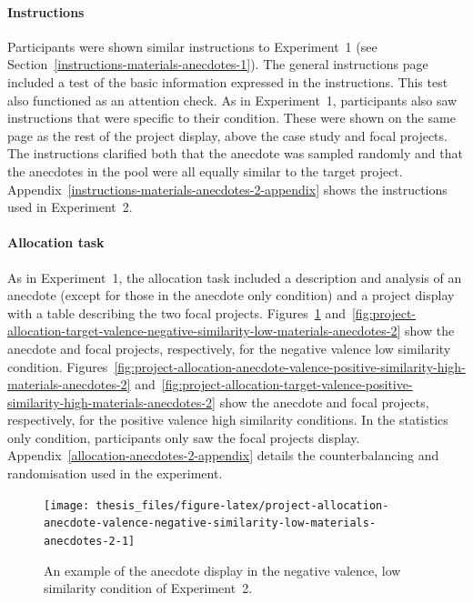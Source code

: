 \documentclass[a4paper, nobind, dvipsnames]{templates/ociamthesis}
\theoremstyle{definition}
\theoremstyle{definition}
\theoremstyle{definition}
\theoremstyle{definition}
\theoremstyle{remark}
\begin{document}
\paragraph{Instructions}

Participants were shown similar instructions to Experiment~1 (see
Section~\ref{instructions-materials-anecdotes-1}). The general instructions
page included a test of the basic information expressed in the instructions.
This test also functioned as an attention check. As in Experiment~1,
participants also saw instructions that were specific to their condition. These
were shown on the same page as the rest of the project display, above the case
study and focal projects. The instructions clarified both that the anecdote was
sampled randomly and that the anecdotes in the pool were all equally similar to
the target project. Appendix~\ref{instructions-materials-anecdotes-2-appendix}
shows the instructions used in Experiment~2.

\hypertarget{allocation-anecdotes-2}{%
\paragraph{Allocation task}\label{allocation-anecdotes-2}}

As in Experiment~1, the allocation task included a description and analysis of
an anecdote (except for those in the anecdote only condition) and a project
display with a table describing the two focal projects.
Figures~\ref{fig:project-allocation-anecdote-valence-negative-similarity-low-materials-anecdotes-2}
and~\ref{fig:project-allocation-target-valence-negative-similarity-low-materials-anecdotes-2}
show the anecdote and focal projects, respectively, for the negative valence
low similarity condition.
Figures~\ref{fig:project-allocation-anecdote-valence-positive-similarity-high-materials-anecdotes-2}
and~\ref{fig:project-allocation-target-valence-positive-similarity-high-materials-anecdotes-2}
show the anecdote and focal projects, respectively, for the positive valence
high similarity conditions. In the statistics only condition, participants only
saw the focal projects display. Appendix~\ref{allocation-anecdotes-2-appendix}
details the counterbalancing and randomisation used in the experiment.



\begin{figure}
\texttt{[image: thesis\_files/figure-latex/project-allocation-anecdote-valence-negative-similarity-low-materials-anecdotes-2-1]} \caption{An example of the anecdote display in the negative valence, low similarity condition of Experiment~2.}\label{fig:project-allocation-anecdote-valence-negative-similarity-low-materials-anecdotes-2}
\end{figure}
\end{document}
